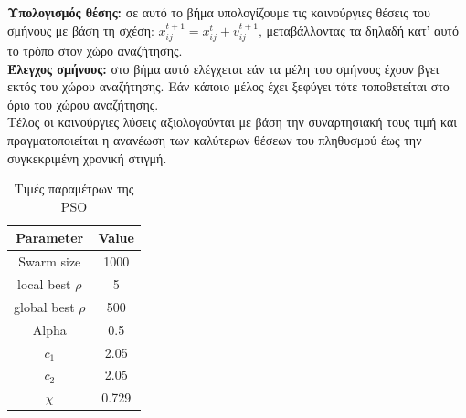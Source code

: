 \documentclass[12pt, a4paper]{article}
\newcommand{\en}{\selectlanguage{english}}
\newcommand{\gr}{\selectlanguage{greek}}
\begin{document}
\textbf{Υπολογισμός θέσης:} σε αυτό το βήμα υπολογίζουμε τις καινούργιες θέσεις του σμήνους με βάση τη σχέση: $x_{ij}^{t+1} = x_{ij}^{t} + v_{ij}^{t+1}$, μεταβάλλοντας τα δηλαδή κατ' αυτό το τρόπο στον χώρο αναζήτησης.\\

\textbf{Έλεγχος σμήνους:} στο βήμα αυτό ελέγχεται εάν τα μέλη του σμήνους έχουν βγει εκτός του χώρου αναζήτησης. Εάν κάποιο μέλος έχει ξεφύγει τότε τοποθετείται στο όριο του χώρου αναζήτησης.\\

Τέλος οι καινούργιες λύσεις αξιολογούνται με βάση την συναρτησιακή τους τιμή και πραγματοποιείται η ανανέωση των καλύτερων θέσεων του πληθυσμού έως την συγκεκριμένη χρονική στιγμή.

\begin{table}[h]
	\centering
	\begin{tabular}{ | c || c | }
		\hline
		\en Parameter & \en Value \\ 
		
		\hline
		\en Swarm size & 1000 \\ 
		
		\hline
		\en local best $\rho$ & 5\\
		
		\hline
		\en global best $\rho$ & 500\\
		
		\hline
		\en Alpha & 0.5\\
		
		\hline
		\en $c_{1}$ & 2.05\\
		
		\hline
		\en $c_{2}$ & 2.05\\
		
		\hline
		\en $\chi$ & 0.729\\
		
		\hline
		
	\end{tabular}
	\caption{Τιμές παραμέτρων της \en PSO\gr}
	\label{tab:PSO_Par}
\end{table}
\end{document}
